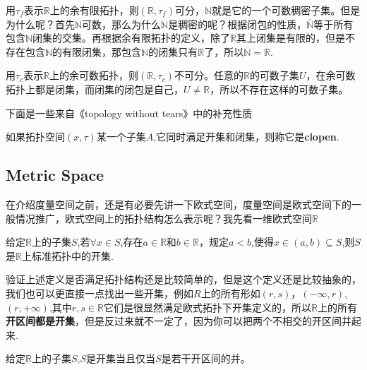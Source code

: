 \begin{example}
用$\tau_f$表示$\mathbb{R}$上的余有限拓扑，则$(\mathbb{R},\tau_f)$可分，$\mathbb{N}$就是它的一个可数稠密子集。但是为什么呢？首先$\mathbb{N}$可数，那么为什么$\mathbb{N}$是稠密的呢？根据闭包的性质，$\overline{\mathbb{N}}$等于所有包含$\mathbb{N}$闭集的交集。再根据余有限拓扑的定义，除了$\mathbb{R}$其上闭集是有限的，但是不存在包含$\mathbb{N}$的有限闭集，那包含$\mathbb{N}$的闭集只有$\mathbb{R}$了，所以$\overline{\mathbb{N}}=\mathbb{R}$.
\end{example}

\begin{example}
用$\tau_c$表示$\mathbb{R}$上的余可数拓扑，则$(\mathbb{R},\tau_c)$不可分。任意的$\mathbb{R}$的可数子集$U$，在余可数拓扑上都是闭集，而闭集的闭包是自己，$U \neq \mathbb{R}$，所以不存在这样的可数子集。
\end{example}

下面是一些来自《topology without tears》中的补充性质

\begin{definition}
如果拓扑空间$(x,\tau)$某一个子集$A$,它同时满足开集和闭集，则称它是\textbf{clopen}.
\end{definition}


\newpage
\subsection{Metric Space}
在介绍度量空间之前，还是有必要先讲一下欧式空间，度量空间是欧式空间下的一般情况推广，欧式空间上的拓扑结构怎么表示呢？我先看一维欧式空间$\mathbb{R}$

\begin{definition}
给定$\mathbb{R}$上的子集$S$,若$\forall x \in S$,存在$a \in \mathbb{R}$和$b \in \mathbb{R}$，规定$a < b$,使得$x \in (a,b) \subseteq S$,则$S$是$\mathbb{R}$上标准拓扑中的开集.
\end{definition}

验证上述定义是否满足拓扑结构还是比较简单的，但是这个定义还是比较抽象的，我们也可以更直接一点找出一些开集，例如$R$上的所有形如$(r,s)$，$(-\infty,r)$,$(r,+\infty)$,其中$r,s \in \mathbb{R}$它们是很显然满足欧式拓扑下开集定义的，所以$\mathbb{R}$上的所有\textbf{开区间都是开集}，但是反过来就不一定了，因为你可以把两个不相交的开区间并起来.

\begin{proposition}
给定$\mathbb{R}$上的子集$S$,$S$是开集当且仅当$S$是若干开区间的并。
\end{proposition}

